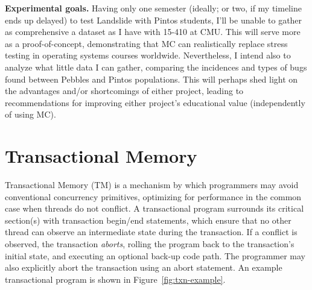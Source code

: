 {\bf Experimental goals.}
Having only one semester (ideally; or two, if my timeline ends up delayed) to test Landslide with Pintos students,
I'll be unable to gather as comprehensive a dataset as I have with 15-410 at CMU.
This will serve more as a proof-of-concept, demonstrating that MC can realistically replace stress testing in operating systems courses worldwide.
Nevertheless, I intend also to analyze what little data I can gather, comparing the incidences and types of bugs found between Pebbles and Pintos populations.
This will perhaps shed light on the advantages and/or shortcomings of either project,
leading to recommendations for improving either project's educational value (independently of using MC).

\section{Transactional Memory}
\label{sec:tm}

Transactional Memory (TM) is a mechanism by which programmers may avoid conventional concurrency primitives, optimizing for performance in the common case when threads do not conflict.
A transactional program surrounds its critical section(s) with transaction begin/end statements, which ensure that no other thread can observe an intermediate state during the transaction.
If a conflict is observed, the transaction {\em aborts}, rolling the program back to the transaction's initial state, and executing an optional back-up code path.
The programmer may also explicitly abort the transaction using an abort statement.
An example transactional program is shown in Figure~\ref{fig:txn-example}.

